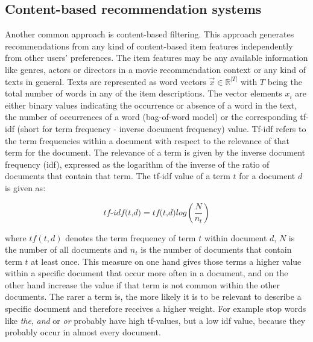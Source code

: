\documentclass[10pt]{reportMaster}
\begin{document}




\subsection{Content-based recommendation systems}
\label{rs_cb}

Another common approach is content-based filtering.
This approach generates recommendations from any kind of content-based item features independently from other users' preferences.
The item features may be any available information like genres, actors or directors in a movie recommendation context or any kind of texts in general.
Texts are represented as word vectors $\vec{x} \in \mathds{R}^{|T|}$ with $T$ being the total number of words in any of the item descriptions.
The vector elements $x_i$ are either binary values indicating the occurrence or absence of a word in the text, the number of occurrences of a word (bag-of-word model) or the corresponding tf-idf (short for term frequency - inverse document frequency) value.
Tf-idf refers to the term frequencies within a document with respect to the relevance of that term for the document.
The relevance of a term is given by the inverse document frequency (idf), expressed as the logarithm of the inverse of the ratio of documents that contain that term.
The tf-idf value of a term $t$ for a document $d$ is given as:

\begin{equation}
	\textit{tf-idf(t,d)} = \textit{tf(t,d)} log(\frac{N}{n_t})
\end{equation}

where $tf(t,d)$ denotes the term frequency of term $t$ within document $d$, $N$ is the number of all documents and $n_t$ is the number of documents that contain term $t$ at least once. 
This measure on one hand gives those terms a higher value within a specific document that occur more often in a document, and on the other hand increase the value if that term is not common within the other documents.
The rarer a term is, the more likely it is to be relevant to describe a specific document and therefore receives a higher weight.
For example stop words like \textit{the}, \textit{and} or \textit{or} probably have high tf-values, but a low idf value, because they probably occur in almost every document.
\end{document}
